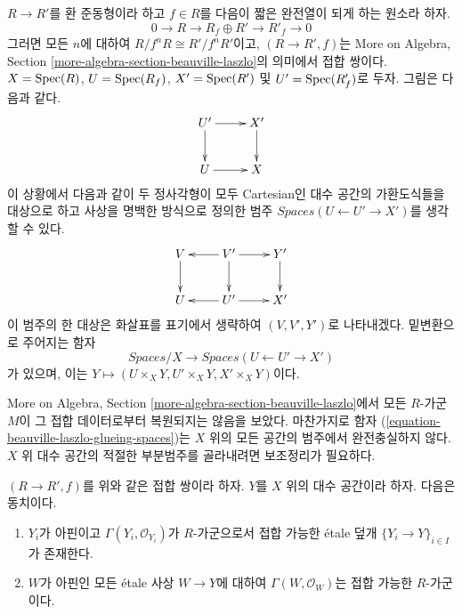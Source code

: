 \noindent
$R \to R'$를 환 준동형이라 하고 $f \in R$를 다음이 짧은 완전열이
되게 하는 원소라 하자.
$$
0 \to R \to R_f \oplus R' \to R'_f \to 0
$$
그러면 모든 $n$에 대하여 $R/f^nR \cong R'/f^nR'$이고,
$(R \to R', f)$는 More on Algebra, Section
\ref{more-algebra-section-beauville-laszlo}의 의미에서 접합 쌍이다.
$X = \mathop{\mathrm{Spec}}(R)$, $U = \mathop{\mathrm{Spec}}(R_f)$, $X' = \mathop{\mathrm{Spec}}(R')$ 및
$U' = \mathop{\mathrm{Spec}}(R'_f)$로 두자. 그림은 다음과 같다.
$$
\xymatrix{
U' \ar[r] \ar[d] & X' \ar[d] \\
U \ar[r] & X
}
$$
이 상황에서 다음과 같이 두 정사각형이 모두 Cartesian인 대수 공간의
가환도식들을 대상으로 하고 사상을 명백한 방식으로 정의한 범주
$\textit{Spaces}(U \leftarrow U' \to X')$를 생각할 수 있다.
$$
\xymatrix{
V \ar[d] & V' \ar[l] \ar[d] \ar[r] & Y' \ar[d] \\
U & U' \ar[l] \ar[r] & X'
}
$$
이 범주의 한 대상은 화살표를 표기에서 생략하여 $(V, V', Y')$로
나타내겠다. 밑변환으로 주어지는 함자
\begin{equation}
\label{equation-beauville-laszlo-glueing-spaces}
\textit{Spaces}/X
\longrightarrow
\textit{Spaces}(U \leftarrow U' \to X')
\end{equation}
가 있으며, 이는 $Y \mapsto (U \times_X Y, U' \times_X Y, X' \times_X Y)$이다.

\medskip\noindent
More on Algebra, Section \ref{more-algebra-section-beauville-laszlo}에서
모든 $R$-가군 $M$이 그 접합 데이터로부터 복원되지는 않음을 보았다.
마찬가지로 함자 (\ref{equation-beauville-laszlo-glueing-spaces})는
$X$ 위의 모든 공간의 범주에서 완전충실하지 않다. $X$ 위 대수 공간의
적절한 부분범주를 골라내려면 보조정리가 필요하다.

\begin{lemma}
\label{lemma-glueable}
$(R \to R', f)$를 위와 같은 접합 쌍이라 하자. $Y$를 $X$ 위의
대수 공간이라 하자. 다음은 동치이다.
\begin{enumerate}
\item $Y_i$가 아핀이고 $\Gamma(Y_i, \mathcal{O}_{Y_i})$가
$R$-가군으로서 접합 가능한 \'etale 덮개
$\{Y_i \to Y\}_{i \in I}$가 존재한다.
\item $W$가 아핀인 모든 \'etale 사상 $W \to Y$에 대하여
$\Gamma(W, \mathcal{O}_W)$는 접합 가능한 $R$-가군이다.
\end{enumerate}
\end{lemma}

